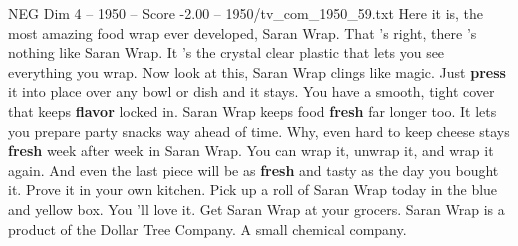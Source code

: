 \begin{textsample}{NEG Dim 4 – 1950 – Score -2.00 – 1950/tv\_com\_1950\_59.txt}  \label{ex:f4_neg_017}
Here it is, the most amazing food wrap ever developed, Saran Wrap.
That 's right, there 's nothing like Saran Wrap.
It 's the crystal clear plastic that lets you see everything you wrap.
Now look at this, Saran Wrap clings like magic.
Just \textbf{press} it into place over any bowl or dish and it stays.
You have a smooth, tight cover that keeps \textbf{flavor} locked in.
Saran Wrap keeps food \textbf{fresh} far longer too.
It lets you prepare party snacks way ahead of time.
Why, even hard to keep cheese stays \textbf{fresh} week after week in Saran Wrap.
You can wrap it, unwrap it, and wrap it again.
And even the last piece will be as \textbf{fresh} and tasty as the day you bought it.
Prove it in your own kitchen.
Pick up a roll of Saran Wrap today in the blue and yellow box.
You 'll love it.
Get Saran Wrap at your grocers.
Saran Wrap is a product of the Dollar Tree Company.
A small chemical company.

\end{textsample}
